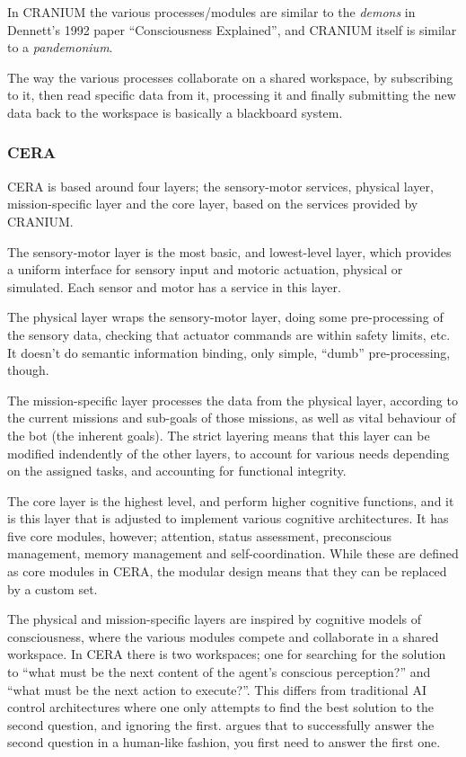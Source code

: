 In CRANIUM the various processes/modules are similar to the \textit{demons} in
Dennett's 1992 paper ``Consciousness Explained'', and CRANIUM itself is similar
to a \textit{pandemonium}\cite{dennet1992consciousness}.

The way the various processes collaborate on a shared workspace, by subscribing
to it, then read specific data from it, processing it and finally submitting the
new data back to the workspace is basically a blackboard
system.\cite{nii1986blackboard}

\subsubsection{CERA}
CERA is based around four layers; the sensory-motor services, physical layer,
mission-specific layer and the core layer, based on the services provided by
CRANIUM.

The sensory-motor layer is the most basic, and lowest-level layer, which
provides a uniform interface for sensory input and motoric actuation, physical
or simulated. Each sensor and motor has a service in this layer.

The physical layer wraps the sensory-motor layer, doing some pre-processing of
the sensory data, checking that actuator commands are within safety limits,
etc. It doesn't do semantic information binding, only simple, ``dumb''
pre-processing, though.

The mission-specific layer processes the data from the physical layer,
according to the current missions and sub-goals of those missions, as well as
vital behaviour of the bot (the inherent goals). The strict layering means that
this layer can be modified indendently of the other layers, to account for
various needs depending on the assigned tasks, and accounting for functional
integrity.

The core layer is the highest level, and perform higher cognitive functions,
and it is this layer that is adjusted to implement various cognitive
architectures. It has five core modules, however; attention, status assessment,
preconscious management, memory management and self-coordination. While these
are defined as core modules in CERA, the modular design means that they can be
replaced by a custom set.

The physical and mission-specific layers are inspired by cognitive models of
consciousness, where the various modules compete and collaborate in a shared
workspace. In CERA there is two workspaces; one for searching for the solution
to ``what must be the next content of the agent's conscious perception?'' and
``what must be the next action to execute?''. This differs from traditional AI
control architectures where one only attempts to find the best solution to the
second question, and ignoring the first. \cite{arrabales2009ceracranium} argues
that to successfully answer the second question in a human-like fashion, you
first need to answer the first one.

